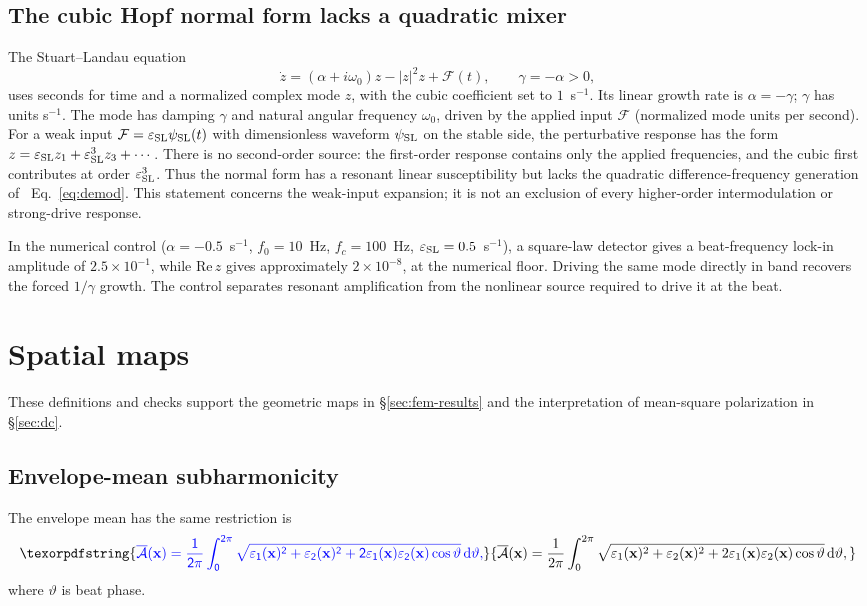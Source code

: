 \documentclass[11pt,a4paper]{article}
\newif\ifjne
\newif\ifsupp
\providecommand{\DIFaddtex}[1]{{\protect\color{blue} \sf #1}} %
\providecommand{\DIFdeltex}[1]{{\protect\color{red} \scriptsize #1}} %
\providecommand{\DIFaddbegin}{} %
\providecommand{\DIFdelbegin}{} %
\providecommand{\DIFdelend}{} %
\providecommand{\DIFadd}[1]{\texorpdfstring{\DIFaddtex{#1}}{#1}} %
\providecommand{\DIFdel}[1]{\texorpdfstring{\DIFdeltex{#1}}{}} %
\begin{document}
\subsection{The cubic Hopf normal form lacks a quadratic mixer}\label{app:sl}
The Stuart--Landau equation \cite{pikovsky2001}
\begin{equation}
\dot z=(\alpha+i\omega_0)z-|z|^2z+\mathcal F(t),\qquad
\gamma=-\alpha>0,
\label{eq:sl}
\end{equation}
uses seconds for time and a normalized complex mode $z$, with the cubic
coefficient set to $1$~s$^{-1}$. Its linear growth rate is $\alpha=-\gamma$;
$\gamma$ has units s$^{-1}$. The mode has damping $\gamma$ and natural angular frequency
$\omega_0$, driven by the applied input $\mathcal F$ (normalized mode units per second). For a weak input
$\mathcal F=\varepsilon_{\rm SL} \psi_{\rm SL}(t)$ with dimensionless waveform $\psi_{\rm SL}$ on the stable side, the perturbative response has
the form $z=\varepsilon_{\rm SL} z_1+\varepsilon_{\rm SL}^3z_3+\cdots$. There is no second-order
source: the first-order response contains only the applied frequencies, and the
cubic first contributes at order $\varepsilon_{\rm SL}^3$. Thus the normal form has a
resonant linear susceptibility but lacks the quadratic difference-frequency
generation of \ifsupp main-text\fi\ Eq.~\eqref{eq:demod}. This statement concerns the weak-input
expansion; it is not an exclusion of every higher-order intermodulation or
strong-drive response.

In the numerical control ($\alpha=-0.5$~s$^{-1}$, $f_0=10$~Hz, $f_c=100$~Hz,
$\varepsilon_{\rm SL}=0.5$~s$^{-1}$), a square-law detector gives a beat-frequency lock-in amplitude
of $2.5\times10^{-1}$, while $\mathrm{Re}\,z$ gives approximately
$2\times10^{-8}$, at the numerical floor. Driving the same mode directly in band
recovers the forced $1/\gamma$ growth. The control separates resonant amplification
from the nonlinear source required to drive it at the beat.

\section{Spatial maps}\label{supp:spatial}
These definitions and checks support the geometric maps in \S\ref{sec:fem-results}
and the interpretation of mean-square polarization in \S\ref{sec:dc}.
\ifjne
\subsection{Envelope-mean subharmonicity}\label{supp:envelope-proof}
The envelope mean \DIFdelbegin \DIFdel{has the same restriction}\DIFdelend \DIFaddbegin \DIFadd{is
}\[
\DIFadd{\overline{\mathcal A}(\mathbf x)=\frac{1}{2\pi}\int_0^{2\pi}
\sqrt{\varepsilon_1(\mathbf x)^2+\varepsilon_2(\mathbf x)^2
+2\varepsilon_1(\mathbf x)\varepsilon_2(\mathbf x)\cos\vartheta}\,\mathrm d\vartheta,
}\]
\DIFadd{where $\vartheta$ is beat phase.
}
\end{document}
